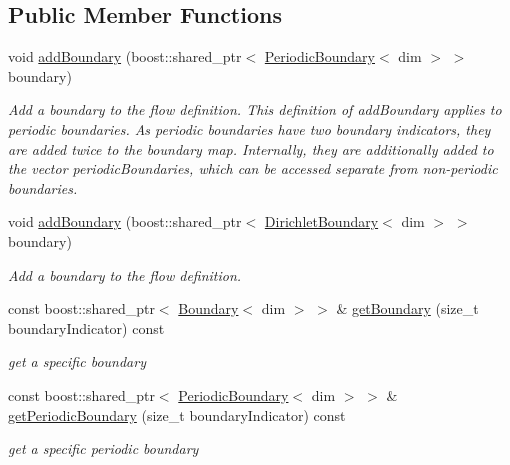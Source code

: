 \subsection*{Public Member Functions}
\begin{DoxyCompactItemize}
\item 
void \hyperlink{classnatrium_1_1BoundaryCollection_a9f957b5338bca01c7bd8c21576ec922c}{addBoundary} (boost::shared\_\-ptr$<$ \hyperlink{classnatrium_1_1PeriodicBoundary}{PeriodicBoundary}$<$ dim $>$ $>$ boundary)
\begin{DoxyCompactList}\small\item\em Add a boundary to the flow definition. This definition of addBoundary applies to periodic boundaries. As periodic boundaries have two boundary indicators, they are added twice to the boundary map. Internally, they are additionally added to the vector periodicBoundaries, which can be accessed separate from non-\/periodic boundaries. \item\end{DoxyCompactList}\item 
void \hyperlink{classnatrium_1_1BoundaryCollection_a907b7a9a09cf2f2affae1ccd66c3d79d}{addBoundary} (boost::shared\_\-ptr$<$ \hyperlink{classnatrium_1_1DirichletBoundary}{DirichletBoundary}$<$ dim $>$ $>$ boundary)
\begin{DoxyCompactList}\small\item\em Add a boundary to the flow definition. \item\end{DoxyCompactList}\item 
const boost::shared\_\-ptr$<$ \hyperlink{classnatrium_1_1Boundary}{Boundary}$<$ dim $>$ $>$ \& \hyperlink{classnatrium_1_1BoundaryCollection_a44816fa48b8100fb37b8ad7491c2cc6c}{getBoundary} (size\_\-t boundaryIndicator) const 
\begin{DoxyCompactList}\small\item\em get a specific boundary \item\end{DoxyCompactList}\item 
const boost::shared\_\-ptr$<$ \hyperlink{classnatrium_1_1PeriodicBoundary}{PeriodicBoundary}$<$ dim $>$ $>$ \& \hyperlink{classnatrium_1_1BoundaryCollection_aea0ba68a319b3ec0f3774ba814e18217}{getPeriodicBoundary} (size\_\-t boundaryIndicator) const 
\begin{DoxyCompactList}\small\item\em get a specific periodic boundary \item\end{DoxyCompactList}\item 

\end{DoxyCompactItemize}
